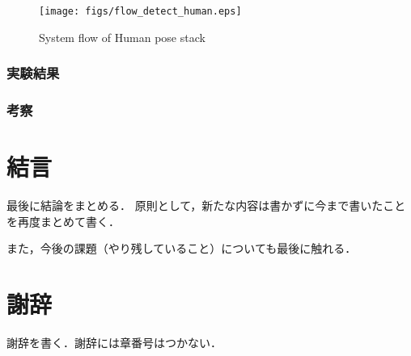 \documentclass[12pt]{sonota/aislab}
\begin{document}
\begin{figure}[t]
\begin{center}
\texttt{[image: figs/flow\_detect\_human.eps]}
\caption{System flow of Human pose stack}
\label{flow}
\end{center}
\end{figure}

\subsection{実験結果}
\subsection{考察}

\chapter{結言}
最後に結論をまとめる．
原則として，新たな内容は書かずに今まで書いたことを再度まとめて書く．

また，今後の課題（やり残していること）についても最後に触れる．

\chapter*{謝辞}
謝辞を書く．謝辞には章番号はつかない．

\end{document}
